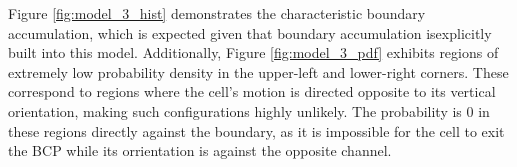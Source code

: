 Figure \ref{fig:model_3_hist} demonstrates the characteristic boundary accumulation, which is expected 
given that boundary accumulation isexplicitly built into this model. Additionally, Figure \ref{fig:model_3_pdf} 
exhibits regions of extremely low probability density in the upper-left and lower-right corners. These correspond 
to regions where the cell's motion is directed opposite to its vertical orientation, making such configurations 
highly unlikely. The probability is $0$ in these regions directly against the boundary, as it is impossible for 
the cell to exit the BCP while its orrientation is against the opposite channel.



